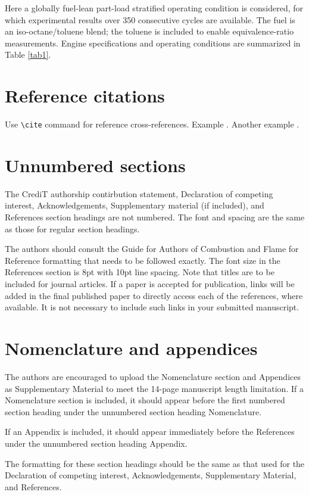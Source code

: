 \documentclass[times,twocolumn,final]{elsarticle}
\begin{document}
Here a globally fuel-lean part-load stratified operating condition is
considered, for which experimental results over 350 consecutive cycles
are available. The fuel is an iso-octane/toluene blend; the toluene is
included to enable equivalence-ratio measurements. Engine
specifications and operating conditions are summarized in Table \ref{tab1}.

\section{Reference citations}
Use \verb+\cite+ command for reference cross-references. Example \cite{NewmanGirvan2004}.
Another example \cite{Vehlowetal2013,SubeljBajec2011a}.


\section*{Unnumbered sections}

The CrediT authorship contirbution statement, Declaration of competing
interest, Acknowledgements, Supplementary material (if included), and
References section headings are not numbered. The font and spacing are
the same as those for regular section headings.

The authors should consult the Guide for Authors of Combustion and
Flame for Reference formatting that needs to be followed exactly. The
font size in the References section is 8pt with 10pt line spacing. Note
that titles are to be included for journal articles. If a paper is
accepted for publication, links will be added in the final published
paper to directly access each of the references, where available. It is
not necessary to include such links in your submitted manuscript.

\section*{Nomenclature and appendices}

The authors are encouraged to upload the Nomenclature section and
Appendices as Supplementary Material to meet the 14-page manuscript
length limitation. If a Nomenclature section is included, it should
appear before the first numbered section heading under the unnumbered
section heading Nomenclature.

If an Appendix is included, it should appear immediately before the
References under the unnumbered section heading Appendix. 

The formatting for these section headings should be the same as that
used for the Declaration of competing interest, Acknowledgements,
Supplementary Material, and References.
\fi
\end{document}
